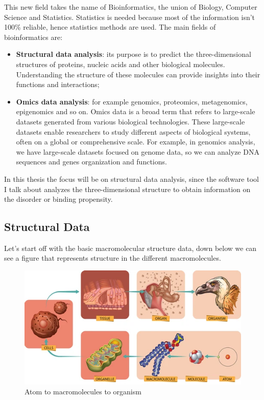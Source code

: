 This new field takes the name of Bioinformatics, the union of Biology, Computer Science and Statistics. Statistics is needed because most of the information isn't 100\% reliable, hence statistics methods are used.
The main fields of bioinformatics are:
\begin{itemize}
    \item \textbf{Structural data analysis}: its purpose is to predict the three-dimensional structures of proteins, nucleic acids and other biological molecules. Understanding the structure of these molecules can provide insights into their functions and interactions;
    \item \textbf{Omics data analysis}: for example genomics, proteomics, metagenomics, epigenomics and so on. Omics data is a broad term that refers to large-scale datasets generated from various biological technologies. These large-scale datasets enable researchers to study different aspects of biological systems, often on a global or comprehensive scale. For example, in genomics analysis, we have large-scale datasets focused on genome data, so we can analyze DNA sequences and genes organization and functions.
\end{itemize}

In this thesis the focus will be on structural data analysis, since the software tool I talk about analyzes the three-dimensional structure to obtain information on the disorder or binding propensity.

\vspace{5em}

\subsection{Structural Data}
Let's start off with the basic macromolecular structure data, down below we can see a figure that represents structure in the different macromolecules.
\pagebreak

\begin{figure}[h!]
    \centering
    \includegraphics{res/proteins_overview/atom_bird.png}
    \caption{Atom to macromolecules to organism}
    \label{fig:atom-bird}
\end{figure}

